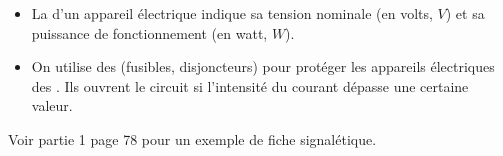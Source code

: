 \begin{mybilan}
	\begin{itemize}
		\item La  d'un appareil électrique indique sa tension nominale (en volts, $V$) et sa puissance de fonctionnement (en watt, $W$).\pause
		\item On utilise des  (fusibles, disjoncteurs) pour protéger les appareils électriques des . Ils ouvrent le circuit si l'intensité du courant dépasse une certaine valeur.
	\end{itemize}
	
	Voir partie 1 page 78 pour un exemple de fiche signalétique.
\end{mybilan}